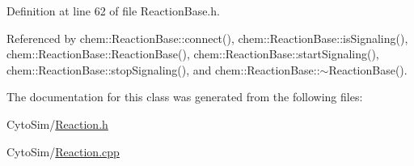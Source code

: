 Definition at line 62 of file Reaction\-Base.\-h.



Referenced by chem\-::\-Reaction\-Base\-::connect(), chem\-::\-Reaction\-Base\-::is\-Signaling(), chem\-::\-Reaction\-Base\-::\-Reaction\-Base(), chem\-::\-Reaction\-Base\-::start\-Signaling(), chem\-::\-Reaction\-Base\-::stop\-Signaling(), and chem\-::\-Reaction\-Base\-::$\sim$\-Reaction\-Base().



The documentation for this class was generated from the following files\-:\begin{DoxyCompactItemize}
\item 
Cyto\-Sim/\hyperlink{Reaction_8h}{Reaction.\-h}\item 
Cyto\-Sim/\hyperlink{Reaction_8cpp}{Reaction.\-cpp}\end{DoxyCompactItemize}
